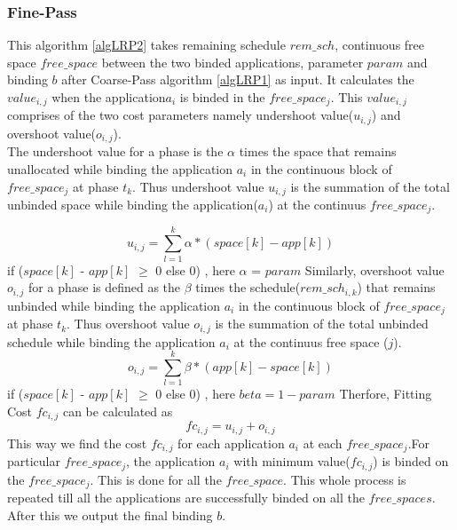 \documentclass[10pt, conference]{IEEEtran}
\begin{document}
\subsubsection{Fine-Pass}
This algorithm \ref{algLRP2} takes remaining schedule $rem\_sch$, continuous free space $free\_space$ between the two binded applications, parameter $param$ and binding $b$ after Coarse-Pass algorithm \ref{algLRP1} as input. It calculates the $value_{i,j}$ when the application$a_i$ is binded in the $free\_space_j$. This $value_{i,j}$ comprises of the two cost parameters namely undershoot value($u_{i,j}$) and overshoot value($o_{i,j}$). \ \\
The undershoot value for a phase is the $\alpha$ times the space that remains unallocated while binding the application $a_i$ in the continuous block of $free\_space_j$ at phase $t_k$. Thus undershoot value $u_{i,j}$ is the summation of the total unbinded space while binding the application($a_i$) at the continuus $free\_space_j$.

\begin{equation} 
u_{i,j} = \sum\limits_{l=1}^k \alpha*(space[k]-app[k])
\label{undershoot}
\end{equation}
if ($space[k]$ - $app[k]$ $\geq$ 0 else 0) , here $\alpha$ = $param$ 
Similarly, overshoot value $o_{i,j}$ for a phase is defined as the $\beta$ times the schedule($rem\_sch_{i,k}$) that remains unbinded while binding the application $a_i$ in the continuous block of $free\_space_j$ at phase $t_k$. Thus overshoot value $o_{i,j}$ is the summation of the total unbinded schedule while binding the application $a_i$ at the continuus free space ($j$).\ \\
\begin{equation} 
o_{i,j} = \sum\limits_{l=1}^k \beta*(app[k]-space[k])
\label{overhoot}
\end{equation}
if ($space[k]$ - $app[k]$ $\geq$ 0 else 0) , here $beta = 1- param$
Therfore, Fitting Cost $fc_{i,j}$ can be calculated as \ \\
\begin{equation} 
fc_{i,j} = u_{i,j} + o_{i,j}
\label{fittingcost}
\end{equation}
This way we find the cost $fc_{i,j}$ for each application $a_i$ at each $free\_space_j$.For particular $free\_space_j$, the application $a_i$ with minimum value($fc_{i,j}$) is binded on the $free\_space_j$. This is done for all the $free\_space$. This whole process is repeated till all the applications are successfully binded on all the $free\_spaces$. After this we output the final binding $b$.
\end{document}
